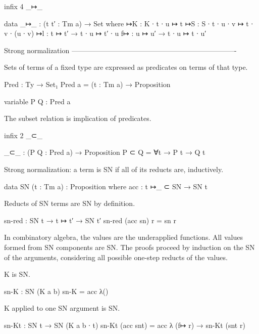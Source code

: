 \begin{code}
infix 4 _↦_

data _↦_ : (t t′ : Tm a) → Set where
  ↦K  : K ∙ t ∙ u      ↦ t
  ↦S  : S ∙ t ∙ u ∙ v  ↦ t ∙ v ∙ (u ∙ v)
  ↦l  : t ↦ t′  → t ∙ u ↦ t′ ∙ u
  f↦  : u ↦ u′  → t ∙ u ↦ t ∙ u′
\end{code}

Strong normalization
----------------------------------------------------------------------

Sets of terms of a fixed type are expressed as predicates on
terms of that type.

\begin{code}
Pred : Ty → Set₁
Pred a = (t : Tm a) → Proposition

variable P Q : Pred a
\end{code}

The subset relation is implication of predicates.

\begin{code}
infix 2 _⊂_

_⊂_ : (P Q : Pred a) → Proposition
P ⊂ Q = ∀{t} → P t → Q t
\end{code}

Strong normalization: a term is SN if all of its reducts are, inductively.

\begin{code}
data SN (t : Tm a) : Proposition where
  acc : t ↦_ ⊂ SN → SN t
\end{code}

Reducts of SN terms are SN by definition.

\begin{code}
sn-red : SN t → t ↦ t′ → SN t′
sn-red (acc sn) r = sn r
\end{code}

In combinatory algebra, the values are the underapplied functions.
All values formed from SN components are SN.
The proofs proceed by induction on the SN of the arguments,
considering all possible one-step reducts of the values.

K is SN.

\begin{code}
sn-K : SN (K {a} {b})
sn-K = acc λ()
\end{code}

K applied to one SN argument is SN.

\begin{code}
sn-Kt : SN t → SN (K {a} {b} ∙ t)
sn-Kt (acc snt) = acc λ{ (f↦ r) → sn-Kt (snt r) }
\end{code}

